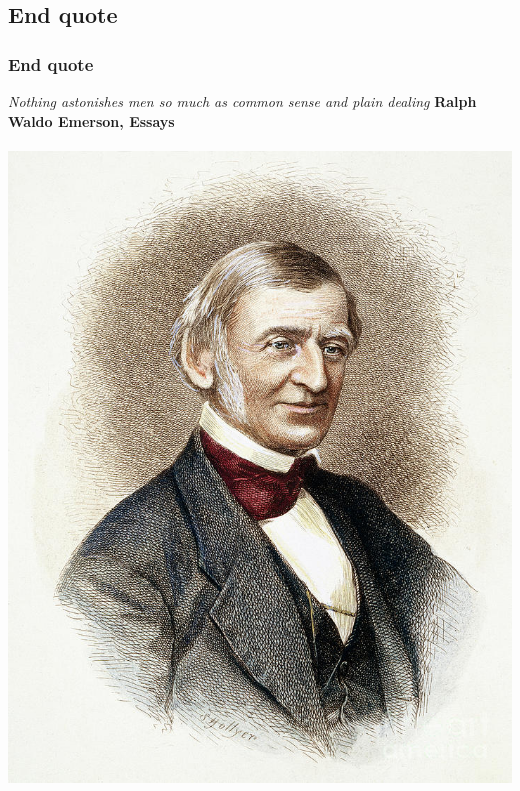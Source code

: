 \documentclass{beamer}
\begin{document}
\subsection{End quote}
\begin{frame}
\frametitle{End quote}
\begin{center}
\Large \textit{Nothing astonishes men so much as common sense and plain dealing}
\large \textbf{Ralph Waldo Emerson, Essays} \\~\\
\includegraphics[scale=0.65]{emerson}
\end{center}
\end{frame}
\end{document}
